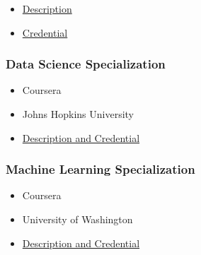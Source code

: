 \documentclass[]{article}
\providecommand{\tightlist}{%
  \setlength{\itemsep}{0pt}\setlength{\parskip}{0pt}}
\begin{document}
\begin{itemize}
\tightlist
\item
  \href{https://aws.amazon.com/certification/certified-cloud-practitioner/}{Description}
\item
  \href{https://www.youracclaim.com/badges/32350702-5891-436d-a581-f5428aab3ad5/public_url}{Credential}
\end{itemize}

\hypertarget{data-science-specialization}{%
\subsubsection{Data Science
Specialization}\label{data-science-specialization}}

\begin{itemize}
\tightlist
\item
  Coursera
\item
  Johns Hopkins University
\item
  \href{https://www.coursera.org/account/accomplishments/specialization/KH5MS3AGYLHT}{Description
  and Credential}
\end{itemize}

\hypertarget{machine-learning-specialization}{%
\subsubsection{Machine Learning
Specialization}\label{machine-learning-specialization}}

\begin{itemize}
\tightlist
\item
  Coursera
\item
  University of Washington
\item
  \href{https://www.coursera.org/account/accomplishments/specialization/QXC4X9QML6EW}{Description
  and Credential}
\end{itemize}
\end{document}
